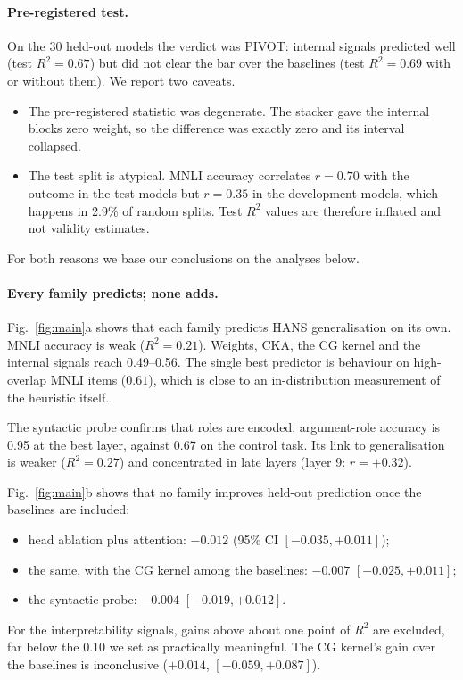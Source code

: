 \documentclass[10pt]{article}
\begin{document}
\paragraph{Pre-registered test.} On the 30 held-out models the verdict was PIVOT: internal signals predicted well (test $R^2=0.67$) but did not clear the bar over the baselines (test $R^2=0.69$ with or without them). We report two caveats.
\begin{itemize}\itemsep0pt
\item The pre-registered statistic was degenerate. The stacker gave the internal blocks zero weight, so the difference was exactly zero and its interval collapsed.
\item The test split is atypical. MNLI accuracy correlates $r=0.70$ with the outcome in the test models but $r=0.35$ in the development models, which happens in 2.9\% of random splits. Test $R^2$ values are therefore inflated and not validity estimates.
\end{itemize}
For both reasons we base our conclusions on the analyses below.

\paragraph{Every family predicts; none adds.} Fig.~\ref{fig:main}a shows that each family predicts HANS generalisation on its own. MNLI accuracy is weak ($R^2=0.21$). Weights, CKA, the CG kernel and the internal signals reach 0.49--0.56. The single best predictor is behaviour on high-overlap MNLI items ($0.61$), which is close to an in-distribution measurement of the heuristic itself.

The syntactic probe confirms that roles are encoded: argument-role accuracy is 0.95 at the best layer, against 0.67 on the control task. Its link to generalisation is weaker ($R^2=0.27$) and concentrated in late layers (layer 9: $r=+0.32$).

Fig.~\ref{fig:main}b shows that no family improves held-out prediction once the baselines are included:
\begin{itemize}\itemsep0pt
\item head ablation plus attention: $-0.012$ (95\% CI $[-0.035, +0.011]$);
\item the same, with the CG kernel among the baselines: $-0.007$ $[-0.025, +0.011]$;
\item the syntactic probe: $-0.004$ $[-0.019, +0.012]$.
\end{itemize}
For the interpretability signals, gains above about one point of $R^2$ are excluded, far below the 0.10 we set as practically meaningful. The CG kernel's gain over the baselines is inconclusive ($+0.014$, $[-0.059, +0.087]$).
\end{document}
